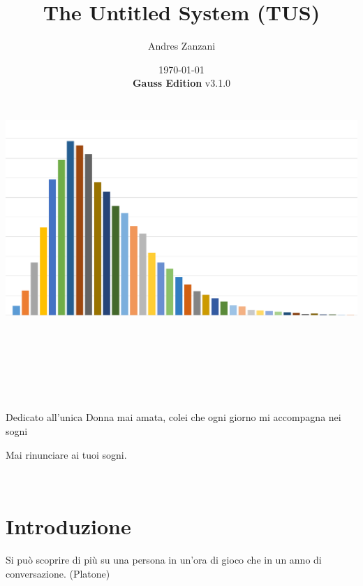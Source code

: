 \documentclass[a4paper,11pt,twoside,openany]{book}
\begin{document}
\title{The Untitled System (TUS)}
\date{\today\\\textbf{Gauss Edition} v3.1.0\\\includegraphics[bb=0 0 1148 636,width=6.85139in,height=3.79514in]{copertina.png}}
\author{Andres Zanzani}
\maketitle
\thispagestyle{empty}

\newpage~\newpage~



Dedicato all'unica Donna mai amata, colei che ogni giorno mi accompagna nei sogni

Mai rinunciare ai tuoi sogni.
\thispagestyle{empty}

\newpage~\thispagestyle{empty}%

\setcounter{page}{0}

\begin{multicols}{2}
	\tableofcontents{}
\end{multicols}

\pagebreak{}

\section{Introduzione}

\pagestyle{plain}

\begin{tcolorbox}[enhanced,arc=5pt,boxrule=0.3pt]{Si può scoprire di più su una persona in un'ora di gioco che in un anno di conversazione. (Platone)}\end{tcolorbox}\medskip
\end{document}
